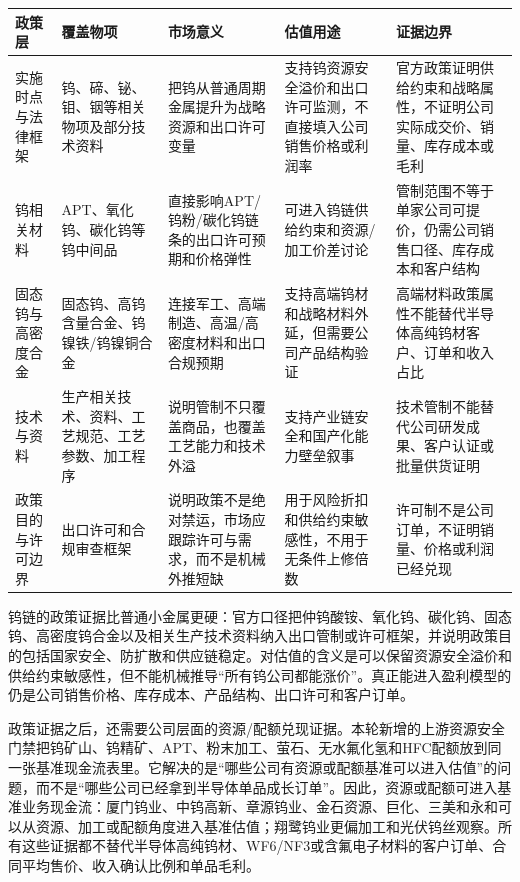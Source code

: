 \begin{exhibitbox}[政策/出口管制官方证据]
\scriptsize
\begin{tabularx}{\exhibitboxwidth}{L{1.5cm} X X X X}
\toprule
\textbf{政策层} & \textbf{覆盖物项} & \textbf{市场意义} & \textbf{估值用途} & \textbf{证据边界} \\
\midrule
实施时点与法律框架 & 钨、碲、铋、钼、铟等相关物项及部分技术资料 & 把钨从普通周期金属提升为战略资源和出口许可变量 & 支持钨资源安全溢价和出口许可监测，不直接填入公司销售价格或利润率 & 官方政策证明供给约束和战略属性，不证明公司实际成交价、销量、库存成本或毛利 \\
钨相关材料 & APT、氧化钨、碳化钨等钨中间品 & 直接影响APT/钨粉/碳化钨链条的出口许可预期和价格弹性 & 可进入钨链供给约束和资源/加工价差讨论 & 管制范围不等于单家公司可提价，仍需公司销售口径、库存成本和客户结构 \\
固态钨与高密度合金 & 固态钨、高钨含量合金、钨镍铁/钨镍铜合金 & 连接军工、高端制造、高温/高密度材料和出口合规预期 & 支持高端钨材和战略材料外延，但需要公司产品结构验证 & 高端材料政策属性不能替代半导体高纯钨材客户、订单和收入占比 \\
技术与资料 & 生产相关技术、资料、工艺规范、工艺参数、加工程序 & 说明管制不只覆盖商品，也覆盖工艺能力和技术外溢 & 支持产业链安全和国产化能力壁垒叙事 & 技术管制不能替代公司研发成果、客户认证或批量供货证明 \\
政策目的与许可边界 & 出口许可和合规审查框架 & 说明政策不是绝对禁运，市场应跟踪许可与需求，而不是机械外推短缺 & 用于风险折扣和供给约束敏感性，不用于无条件上修倍数 & 许可制不是公司订单，不证明销量、价格或利润已经兑现 \\
\bottomrule
\end{tabularx}
\end{exhibitbox}

钨链的政策证据比普通小金属更硬：官方口径把仲钨酸铵、氧化钨、碳化钨、固态钨、高密度钨合金以及相关生产技术资料纳入出口管制或许可框架，并说明政策目的包括国家安全、防扩散和供应链稳定。对估值的含义是可以保留资源安全溢价和供给约束敏感性，但不能机械推导“所有钨公司都能涨价”。真正能进入盈利模型的仍是公司销售价格、库存成本、产品结构、出口许可和客户订单。

政策证据之后，还需要公司层面的资源/配额兑现证据。本轮新增的上游资源安全门禁把钨矿山、钨精矿、APT、粉末加工、萤石、无水氟化氢和HFC配额放到同一张基准现金流表里。它解决的是“哪些公司有资源或配额基准可以进入估值”的问题，而不是“哪些公司已经拿到半导体单品成长订单”。因此，资源或配额可进入基准业务现金流：厦门钨业、中钨高新、章源钨业、金石资源、巨化、三美和永和可以从资源、加工或配额角度进入基准估值；翔鹭钨业更偏加工和光伏钨丝观察。所有这些证据都不替代半导体高纯钨材、WF6/NF3或含氟电子材料的客户订单、合同平均售价、收入确认比例和单品毛利。

